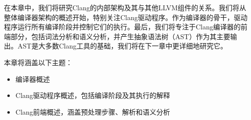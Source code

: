 在本章中，我们将研究Clang的内部架构及其与其他LLVM组件的关系。我们将从整体编译器架构的概述开始，特别关注Clang驱动程序。作为编译器的骨干，驱动程序运行所有编译阶段并控制它们的执行。最后，我们将专注于Clang编译器的前端部分，包括词法分析和语义分析，并产生抽象语法树（AST）作为其主要输出。AST是大多数Clang工具的基础，我们将在下一章中更详细地研究它。

本章将涵盖以下主题：

\begin{itemize}
\item
编译器概述

\item
Clang驱动程序概述，包括编译阶段及其执行的解释

\item
Clang前端概述，涵盖预处理步骤、解析和语义分析
\end{itemize}